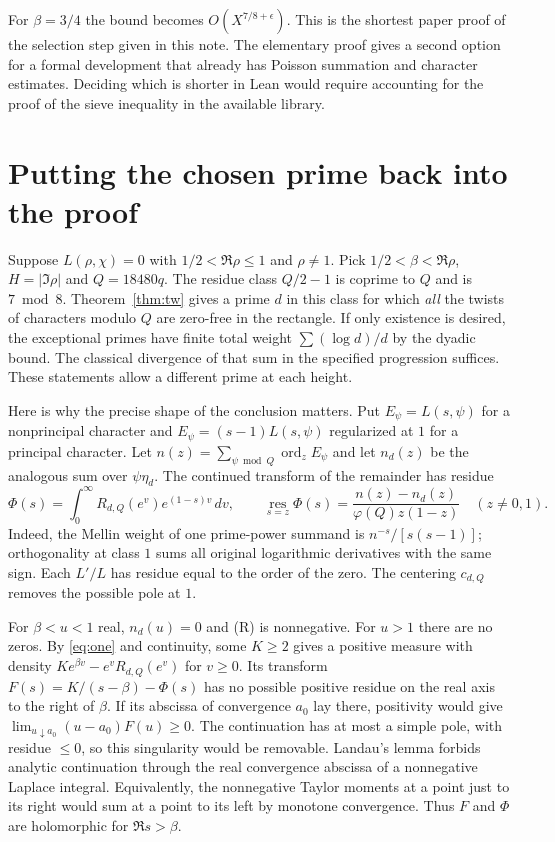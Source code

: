 \documentclass[11pt]{article}
\begin{document}
For $\beta=3/4$ the bound becomes $O(X^{7/8+\epsilon})$. This is the shortest paper proof of the selection step given in this note. The elementary proof gives a second option for a formal development that already has Poisson summation and character estimates. Deciding which is shorter in Lean would require accounting for the proof of the sieve inequality in the available library.


\newpage
\section{Putting the chosen prime back into the proof}\label{sec:insert}
Suppose $L(\rho,\chi)=0$ with $1/2<\Re\rho\le1$ and $\rho\ne1$. Pick $1/2<\beta<\Re\rho$, $H=|\Im\rho|$ and $Q=18480q$. The residue class $Q/2-1$ is coprime to $Q$ and is $7\bmod8$. Theorem~\ref{thm:tw} gives a prime $d$ in this class for which \emph{all} the twists of characters modulo $Q$ are zero-free in the rectangle. If only existence is desired, the exceptional primes have finite total weight $\sum(\log d)/d$ by the dyadic bound. The classical divergence of that sum in the specified progression suffices. These statements allow a different prime at each height.

Here is why the precise shape of the conclusion matters. Put $E_\psi=L(s,\psi)$ for a nonprincipal character and $E_\psi=(s-1)L(s,\psi)$ regularized at $1$ for a principal character. Let $n(z)=\sum_{\psi\bmod Q}\operatorname{ord}_z E_\psi$ and let $n_d(z)$ be the analogous sum over $\psi\eta_d$. The continued transform of the remainder has residue
\begin{equation}
 \Phi(s)=\int_0^\infty R_{d,Q}(e^v)e^{(1-s)v}\,dv,
 \qquad \operatorname*{res}_{s=z}\Phi(s)
        =\frac{n(z)-n_d(z)}{\varphi(Q)z(1-z)}\quad(z\ne0,1).       \tag{R}
\end{equation}
Indeed, the Mellin weight of one prime-power summand is $n^{-s}/[s(s-1)]$; orthogonality at class $1$ sums all original logarithmic derivatives with the same sign. Each $L'/L$ has residue equal to the order of the zero. The centering $c_{d,Q}$ removes the possible pole at $1$.

For $\beta<u<1$ real, $n_d(u)=0$ and (R) is nonnegative. For $u>1$ there are no zeros. By \eqref{eq:one} and continuity, some $K\ge2$ gives a positive measure with density $K e^{\beta v}-e^vR_{d,Q}(e^v)$ for $v\ge0$. Its transform $F(s)=K/(s-\beta)-\Phi(s)$ has no possible positive residue on the real axis to the right of $\beta$. If its abscissa of convergence $a_0$ lay there, positivity would give $\lim_{u\downarrow a_0}(u-a_0)F(u)\ge0$. The continuation has at most a simple pole, with residue $\le0$, so this singularity would be removable. Landau's lemma forbids analytic continuation through the real convergence abscissa of a nonnegative Laplace integral. Equivalently, the nonnegative Taylor moments at a point just to its right would sum at a point to its left by monotone convergence. Thus $F$ and $\Phi$ are holomorphic for $\Re s>\beta$.
\end{document}
